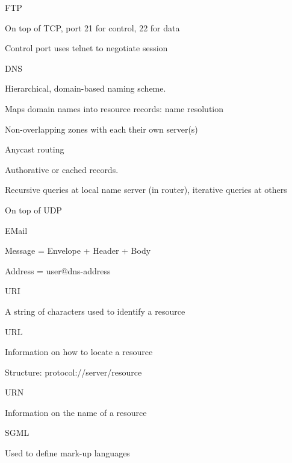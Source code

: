 \documentclass[main.tex]{subfiles}
\begin{document}
\begin{card}{FTP}
\item On top of TCP, port 21 for control, 22 for data
\item Control port uses telnet to negotiate session
\end{card}

\begin{card}{DNS}
\item Hierarchical, domain-based naming scheme.
\item Maps domain names into resource records: name resolution
\item Non-overlapping zones with each their own server(s)
\item Anycast routing
\item Authorative or cached records.
\item Recursive queries at local name server (in router), iterative queries at others
\item On top of UDP
\end{card}

\begin{card}{EMail}
\item Message = Envelope + Header + Body
\item Address = user@dns-address
\end{card}

\begin{card}{URI}
\item A string of characters used to identify a resource
\end{card}

\begin{card}{URL}
\item Information on how to locate a resource
\item Structure: protocol://server/resource
\end{card}

\begin{card}{URN}
\item Information on the name of a resource
\end{card}

\begin{card}{SGML}
\item Used to define mark-up languages
\end{card}
\end{document}
